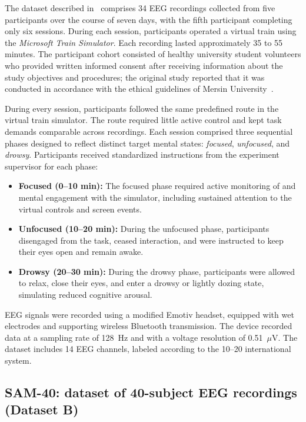 \documentclass[10pt,letterpaper]{article}
\begin{document}
The dataset described in~\cite{aci2019attention} comprises 34 EEG recordings collected from five participants over the course of seven days, with the fifth participant completing only six sessions. During each session, participants operated a virtual train using the \textit{Microsoft Train Simulator}. Each recording lasted approximately 35 to 55 minutes. The participant cohort consisted of healthy university student volunteers who provided written informed consent after receiving information about the study objectives and procedures; the original study reported that it was conducted in accordance with the ethical guidelines of Mersin University~\cite{aci2019attention}.

During every session, participants followed the same predefined route in the virtual train simulator. The route required little active control and kept task demands comparable across recordings. Each session comprised three sequential phases designed to reflect distinct target mental states: \textit{focused}, \textit{unfocused}, and \textit{drowsy}. Participants received standardized instructions from the experiment supervisor for each phase:

\begin{itemize}
  \item \textbf{Focused (0--10 min):} The focused phase required active monitoring of and mental engagement with the simulator, including sustained attention to the virtual controls and screen events.
  \item \textbf{Unfocused (10--20 min):} During the unfocused phase, participants disengaged from the task, ceased interaction, and were instructed to keep their eyes open and remain awake.
  \item \textbf{Drowsy (20--30 min):} During the drowsy phase, participants were allowed to relax, close their eyes, and enter a drowsy or lightly dozing state, simulating reduced cognitive arousal.
\end{itemize}

EEG signals were recorded using a modified Emotiv headset, equipped with wet electrodes and supporting wireless Bluetooth transmission. The device recorded data at a sampling rate of 128~Hz and with a voltage resolution of 0.51~$\mu$V. The dataset includes 14 EEG channels, labeled according to the 10--20 international system.

\subsection*{SAM-40: dataset of 40-subject EEG recordings (Dataset B)}
\end{document}
